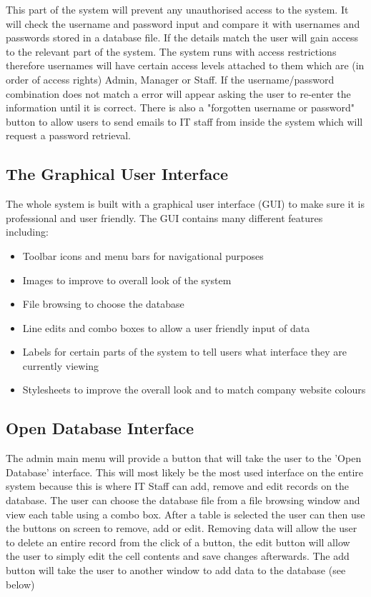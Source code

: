 This part of the system will prevent any unauthorised access to the system. It will check the username and password input and compare it with usernames and passwords stored in a database file. If the details match the user will gain access to the relevant part of the system. The system runs with access restrictions therefore usernames will have certain access levels attached to them which are (in order of access rights) Admin, Manager or Staff. If the username/password combination does not match a error will appear asking the user to re-enter the information until it is correct. There is also a "forgotten username or password" button to allow users to send emails to IT staff from inside the system which will request a password retrieval.

\subsection{The Graphical User Interface}

The whole system is built with a graphical user interface (GUI) to make sure it is professional and user friendly. The GUI contains many different features including:
\begin{itemize}
\item Toolbar icons and menu bars for navigational purposes
\item Images to improve to overall look of the system
\item File browsing to choose the database
\item Line edits and combo boxes to allow a user friendly input of data
\item Labels for certain parts of the system to tell users what interface they are currently viewing
\item Stylesheets to improve the overall look and to match company website colours
\end{itemize}

\subsection{Open Database Interface}

The admin main menu will provide a button that will take the user to the 'Open Database' interface. This will most likely be the most used interface on the entire system because this is where IT Staff can add, remove and edit records on the database. The user can choose the database file from a file browsing window and view each table using a combo box. After a table is selected the user can then use the buttons on screen to remove, add or edit. Removing data will allow the user to delete an entire record from the click of a button, the edit button will allow the user to simply edit the cell contents and save changes afterwards. The add button will take the user to another window to add data to the database (see below)

